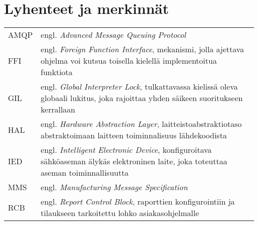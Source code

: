 \chapter*{Lyhenteet ja merkinnät}
\label{ch:lyhenteetjamerkinnat}

\begin{tabular}[h]{@{} p{} p{} @{}}
	AMQP & engl. \emph{Advanced Message Queuing Protocol} \\
	FFI & engl. \emph{Foreign Function Interface}, mekanismi, jolla ajettava ohjelma voi kutsua toisella kielellä implementoitua funktiota\\
	GIL & engl. \emph{Global Interpreter Lock}, tulkattavassa kielissä oleva globaali lukitus, joka rajoittaa yhden säikeen suoritukseen kerrallaan \\
	HAL & engl. \emph{Hardware Abstraction Layer}, laitteistoabstraktiotaso abstraktoimaan laitteen toiminnalisuus lähdekoodista \\
	IED & engl. \emph{Intelligent Electronic Device}, konfiguroitava sähköaseman älykäs elektroninen laite, joka toteuttaa aseman toiminnallisuutta \\
	MMS & engl. \emph{Manufacturing Message Specification} \\
	RCB & engl. \emph{Report Control Block}, raporttien konfigurointiin ja tilaukseen tarkoitettu lohko asiakasohjelmalle \\
\end{tabular}